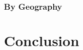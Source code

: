 \documentclass[11pt]{article}
\begin{document}
\subsubsection{By Geography}

\section{Conclusion}



\end{document}
